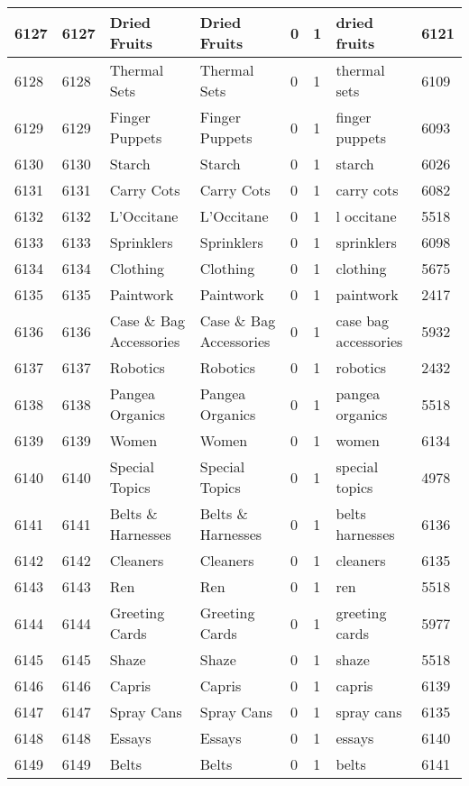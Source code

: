 \begin{longtable}{|l|l|l|l|l|l|l|l|}
6127 & 6127 & Dried Fruits & Dried Fruits & 0 & 1 & dried fruits & 6121 \\ \hline 
6128 & 6128 & Thermal Sets & Thermal Sets & 0 & 1 & thermal sets & 6109 \\ \hline 
6129 & 6129 & Finger Puppets & Finger Puppets & 0 & 1 & finger puppets & 6093 \\ \hline 
6130 & 6130 & Starch & Starch & 0 & 1 & starch & 6026 \\ \hline 
6131 & 6131 & Carry Cots & Carry Cots & 0 & 1 & carry cots & 6082 \\ \hline 
6132 & 6132 & L'Occitane & L'Occitane & 0 & 1 & l occitane & 5518 \\ \hline 
6133 & 6133 & Sprinklers & Sprinklers & 0 & 1 & sprinklers & 6098 \\ \hline 
6134 & 6134 & Clothing & Clothing & 0 & 1 & clothing & 5675 \\ \hline 
6135 & 6135 & Paintwork & Paintwork & 0 & 1 & paintwork & 2417 \\ \hline 
6136 & 6136 & Case \& Bag Accessories & Case \& Bag Accessories & 0 & 1 & case bag accessories & 5932 \\ \hline 
6137 & 6137 & Robotics & Robotics & 0 & 1 & robotics & 2432 \\ \hline 
6138 & 6138 & Pangea Organics & Pangea Organics & 0 & 1 & pangea organics & 5518 \\ \hline 
6139 & 6139 & Women & Women & 0 & 1 & women & 6134 \\ \hline 
6140 & 6140 & Special Topics & Special Topics & 0 & 1 & special topics & 4978 \\ \hline 
6141 & 6141 & Belts \& Harnesses & Belts \& Harnesses & 0 & 1 & belts harnesses & 6136 \\ \hline 
6142 & 6142 & Cleaners & Cleaners & 0 & 1 & cleaners & 6135 \\ \hline 
6143 & 6143 & Ren & Ren & 0 & 1 & ren & 5518 \\ \hline 
6144 & 6144 & Greeting Cards & Greeting Cards & 0 & 1 & greeting cards & 5977 \\ \hline 
6145 & 6145 & Shaze & Shaze & 0 & 1 & shaze & 5518 \\ \hline 
6146 & 6146 & Capris & Capris & 0 & 1 & capris & 6139 \\ \hline 
6147 & 6147 & Spray Cans & Spray Cans & 0 & 1 & spray cans & 6135 \\ \hline 
6148 & 6148 & Essays & Essays & 0 & 1 & essays & 6140 \\ \hline 
6149 & 6149 & Belts & Belts & 0 & 1 & belts & 6141 \\ \hline 

\end{longtable}
